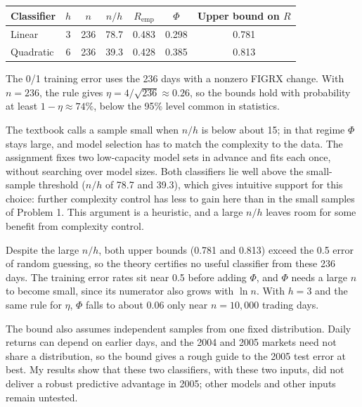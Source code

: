 \begin{center}\small
\begin{tabular}{lcccccc}
\toprule
Classifier & $h$ & $n$ & $n/h$ & $R_{\text{emp}}$ & $\Phi$ & Upper bound on $R$ \\
\midrule
Linear & 3 & 236 & 78.7 & 0.483 & 0.298 & 0.781 \\
Quadratic & 6 & 236 & 39.3 & 0.428 & 0.385 & 0.813 \\
\bottomrule
\end{tabular}
\end{center}

The 0/1 training error uses the 236 days with a nonzero FIGRX change. With $n = 236$, the rule gives
$\eta = 4/\sqrt{236} \approx 0.26$, so the bounds hold with probability at least $1 - \eta \approx 74\%$, below the
95\% level common in statistics.

The textbook calls a sample small when $n/h$ is below about 15; in that regime $\Phi$ stays large, and model
selection has to match the complexity to the data. The
assignment fixes two low-capacity model sets in advance and fits each once, without searching over model sizes. Both
classifiers lie well above the small-sample threshold ($n/h$ of 78.7 and 39.3), which gives intuitive support for this
choice: further complexity control has less to gain here than in the small samples of Problem 1. This argument is a
heuristic, and a large $n/h$ leaves room for some benefit from complexity control.

Despite the large $n/h$, both upper bounds (0.781 and 0.813) exceed the 0.5 error of random guessing, so the theory
certifies no useful classifier from these 236 days. The training error rates sit near 0.5 before adding $\Phi$, and $\Phi$ needs a
large $n$ to become small, since its numerator also grows with $\ln n$. With $h = 3$ and the same rule for $\eta$,
$\Phi$ falls to about 0.06 only near $n = 10{,}000$ trading days.

The bound also assumes independent samples from one fixed distribution. Daily returns can depend on earlier days,
and the 2004 and 2005 markets need not share a distribution, so the bound gives a rough guide to the 2005 test error
at best. My results show that these two classifiers, with these two inputs, did not deliver a robust predictive
advantage in 2005; other models and other inputs remain untested.
